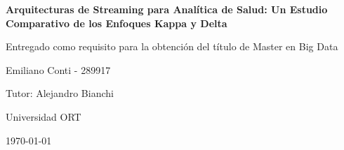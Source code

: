 \begin{titlepage}
    \centering
    {\huge\bfseries Arquitecturas de Streaming para Analítica de Salud: Un Estudio Comparativo de los Enfoques Kappa y Delta \par}
    \vspace{2cm}
    {\Large Entregado como requisito para la obtención del
título de Master en Big Data\par}
    \vspace{1cm}
    {\large Emiliano Conti - 289917\par}
    \vspace{1cm}
    {\large Tutor: Alejandro Bianchi \par}
    \vspace{1cm}
    {\small Universidad ORT\par}
    \vspace{1cm}
    {\large \today\par}
\end{titlepage}